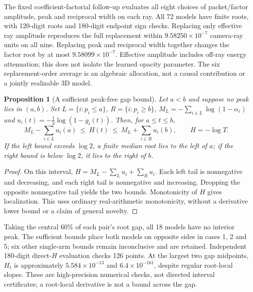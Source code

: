 \documentclass[11pt,a4paper]{article}
\newtheorem{proposition}[theorem]{Proposition}
\begin{document}
The fixed coefficient-factorial follow-up evaluates all eight choices
of packet/factor amplitude, peak and reciprocal width on each ray.
All 72 models have finite roots, with 120-digit roots and 180-digit
endpoint sign checks. Replacing only effective ray amplitude reproduces
the full replacement within $9.58250\times10^{-7}$ camera-ray units
on all nine. Replacing peak and reciprocal width together changes
the factor root by at most $9.58099\times10^{-7}$. Effective amplitude
includes off-ray energy attenuation; this does not isolate the learned
opacity parameter. The six replacement-order average is an algebraic
allocation, not a causal contribution or a jointly realizable 3D model.

\begin{proposition}[A sufficient peak-free gap bound]
Let $a<b$ and suppose no peak lies in $(a,b)$. Set
$L=\{i:p_i\leq a\}$, $R=\{i:p_i\geq b\}$,
$M_L=-\sum_{i\in L}\log(1-\alpha_i)$ and
$u_i(t)=-\tfrac12\log(1-g_i(t))$. Then, for $a\leq t\leq b$,
\[
 M_L-\sum_{i\in L}u_i(a)\ \leq\ H(t)\ \leq\
 M_L+\sum_{i\in R}u_i(b),\qquad H=-\log T.
\]
If the left bound exceeds $\log2$, a finite median root lies to
the left of $a$; if the right bound is below $\log2$, it lies to
the right of $b$.
\end{proposition}
\begin{proof}
On this interval, $H=M_L-\sum_Lu_i+\sum_Ru_i$.
Each left tail is nonnegative and decreasing, and each right tail
is nonnegative and increasing. Dropping the opposite nonnegative
tail yields the two bounds. Monotonicity of $H$ gives localization.
This uses ordinary real-arithmetic monotonicity, without a derivative
lower bound or a claim of general novelty.
\end{proof}

Taking the central 60\% of each pair's root gap, all 18 models have
no interior peak. The sufficient bounds place both models on opposite
sides in cases 1, 2 and 5; six other single-arm bounds remain
inconclusive and are retained. Independent 180-digit direct-$H$
evaluation checks 126 points. At the largest two gap midpoints,
$H_t$ is approximately $5.584\times10^{-13}$ and
$6.4\times10^{-161}$, despite regular root-local slopes.
These are high-precision numerical checks, not directed interval
certificates; a root-local derivative is not a bound across the gap.
\end{document}
